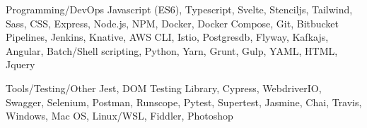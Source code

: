 

\begin{cvskills}

  \cvskill
    {Programming/DevOps} %
    {Javascript (ES6), Typescript, Svelte, Stenciljs, Tailwind, Sass, CSS, Express, Node.js, NPM, Docker, Docker Compose, Git, Bitbucket Pipelines, Jenkins, Knative, AWS CLI, Istio, Postgresdb, Flyway, Kafkajs, Angular, Batch/Shell scripting, Python, Yarn, Grunt, Gulp, YAML, HTML, Jquery} %

  \cvskill
    {Tools/Testing/Other} %
    {Jest, DOM Testing Library, Cypress, WebdriverIO, Swagger, Selenium, Postman, Runscope, Pytest, Supertest, Jasmine, Chai, Travis, Windows, Mac OS, Linux/WSL, Fiddler, Photoshop} %

\end{cvskills}
